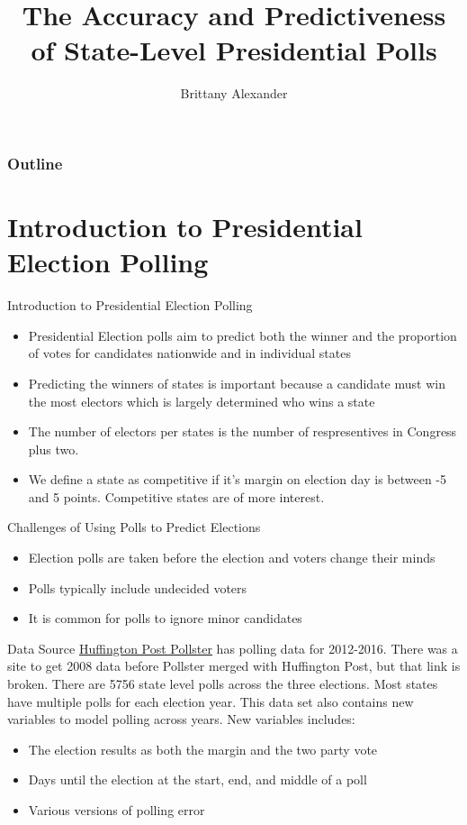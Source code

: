 \documentclass{beamer}\usepackage[]{graphicx}\usepackage[]{color}
\title{The Accuracy and Predictiveness of State-Level Presidential Polls}
\author{Brittany Alexander}
\begin{document}
\begin{frame}
\titlepage
\end{frame}
\begin{frame}
\frametitle{Outline}
  \tableofcontents
\end{frame}





\section{Introduction to Presidential Election Polling}
\begin{frame}{Introduction to Presidential Election Polling}
\begin{itemize}
\item Presidential Election polls aim to predict both the winner and the proportion of votes for candidates nationwide and in individual states
\item Predicting the winners of states is important because a candidate must win the most electors which is largely determined who wins a state
\item The number of electors per states is the number of respresentives in Congress plus two.
\item We define a state as competitive if it's margin on election day is between -5 and 5 points. Competitive states are of more interest.
\end{itemize}
\end{frame}


\begin{frame}{Challenges of Using Polls to Predict Elections}
\begin{itemize}
\item Election polls are taken before the election and voters change their minds
\item Polls typically include undecided voters
\item It is common for polls to ignore minor candidates

\end{itemize}
\end{frame}

\begin{frame}{Data Source}
\href{https://elections.huffingtonpost.com/pollster}{Huffington Post Pollster} has polling data for 2012-2016.  There was a site to get 2008 data before Pollster merged with Huffington Post, but that link is broken. There are 5756 state level polls across the three elections. Most states have multiple polls for each election year. This data set also contains new variables to model polling across years. New variables includes:
\begin{itemize}
\item The election results as both the margin and the two party vote
\item Days until the election at the start, end, and middle of a poll
\item Various versions of polling error
\end{itemize}

\end{frame}
\end{document}
